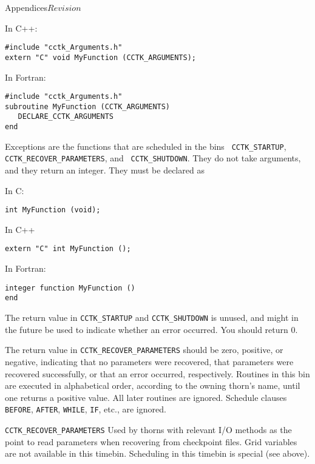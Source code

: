 \begin{cactuspart}{Appendices}{}{$Revision$}
\begin{Lentry}
\item[In C++:]
\begin{verbatim}
#include "cctk_Arguments.h"
extern "C" void MyFunction (CCTK_ARGUMENTS);
\end{verbatim}

\item[In Fortran:]
\begin{verbatim}
#include "cctk_Arguments.h"
subroutine MyFunction (CCTK_ARGUMENTS)
   DECLARE_CCTK_ARGUMENTS
end
\end{verbatim}
\end{Lentry}

Exceptions are the functions that are scheduled in the bins {\tt
CCTK\_STARTUP}, {\tt CCTK\_RECOVER\_PARAMETERS}, and {\tt
CCTK\_SHUTDOWN}.  They do not take arguments,
and they return an integer.  They must be declared as
\begin{Lentry}

\item[In C:]
\begin{verbatim}
int MyFunction (void);
\end{verbatim}

\item[In C++]
\begin{verbatim}
extern "C" int MyFunction ();
\end{verbatim}

\item[In Fortran:]
\begin{verbatim}
integer function MyFunction ()
end
\end{verbatim}
\end{Lentry}

The return value in {\tt CCTK\_STARTUP} and {\tt CCTK\_SHUTDOWN} is
unused, and might in the future be used to indicate whether an error
occurred.  You should return 0.

The return value in {\tt CCTK\_RECOVER\_PARAMETERS} should be zero,
positive, or negative, indicating that no parameters were recovered,
that parameters were recovered successfully, or that an error
occurred, respectively.  Routines in this bin are executed in alphabetical
order, according to the owning thorn's name, until one returns a positive
value.  All later routines are ignored.  Schedule clauses \texttt{BEFORE}, 
\texttt{AFTER}, \texttt{WHILE}, \texttt{IF}, etc., are ignored.


\begin{Lentry}

\item[{\tt CCTK\_RECOVER\_PARAMETERS}]
        Used by thorns with relevant I/O methods as the point 
        to read parameters when recovering from checkpoint files.
        Grid variables are not available in this timebin.  Scheduling
	in this timebin is special (see above).


\end{Lentry}
\end{cactuspart}
